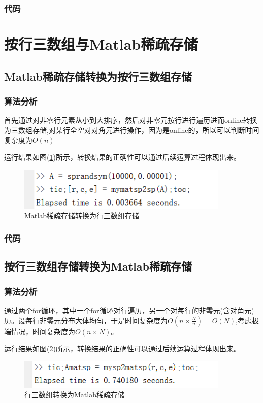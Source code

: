 \documentclass[a4paper,left=2.5cm,right=2.5cm]{article}
\begin{document}
\begin{spacing}{1.6}
			\subsubsection{代码}
		
		\section{按行三数组与Matlab稀疏存储}
		\subsection{Matlab稀疏存储转换为按行三数组存储}
		\subsubsection{算法分析}
		首先通过对非零行元素从小到大排序，然后对非零元按行进行遍历进而online转换为三数组存储,对某行全空对对角元进行操作，因为是online的，所以可以判断时间复杂度为$O(n)$
		
		运行结果如图(\ref{matsp2sp})所示，转换结果的正确性可以通过后续运算过程体现出来。
		\begin{figure}[H]
			\includegraphics[width=0.9\textwidth]{image/matsp2sp.png}
			\caption{Matlab稀疏存储转换为行三数组存储}
			\label{matsp2sp}
		\end{figure}
		\subsubsection{代码}
		
		\subsection{按行三数组存储转换为Matlab稀疏存储}
		\subsubsection{算法分析}
		通过两个for循环，其中一个for循环对行遍历，另一个对每行的非零元(含对角元)历。设每行非零元分布大体均匀，于是时间复杂度为$O(n\times \frac{N}{n}) = O(N)$,考虑极端情况，时间复杂度为$O(n\times N)$。
		
		运行结果如图(\ref{sp2matsp})所示，转换结果的正确性可以通过后续运算过程体现出来。
		\begin{figure}[H]
			\includegraphics[width=0.9\textwidth]{image/sp2matsp.png}
			\caption{行三数组转换为Matlab稀疏存储}
			\label{sp2matsp}
		\end{figure}

\end{spacing}
\end{document}
